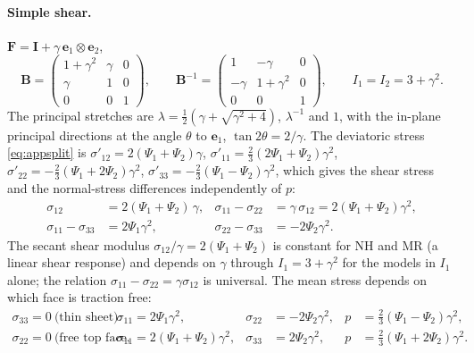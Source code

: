 \documentclass[11pt]{article}
\newcommand{\be}{\bm{e}}
\newcommand{\bF}{\bm{F}}
\newcommand{\bB}{\bm{B}}
\newcommand{\bI}{\bm{I}}
\newcommand{\Pone}{\Psi_{1}}
\newcommand{\Ptwo}{\Psi_{2}}
\newcommand{\Ione}{I_1}
\newcommand{\Itwo}{I_2}
\begin{document}
\paragraph{Simple shear.}
$\bF = \bI + \gamma\,\be_1\otimes\be_2$,
\begin{equation}
  \bB = \begin{pmatrix} 1+\gamma^2 & \gamma & 0 \\ \gamma & 1 & 0 \\ 0 & 0 & 1\end{pmatrix}, \qquad
  \bB^{-1} = \begin{pmatrix} 1 & -\gamma & 0 \\ -\gamma & 1+\gamma^2 & 0 \\ 0 & 0 & 1\end{pmatrix}, \qquad
  \Ione = \Itwo = 3 + \gamma^2 .
\end{equation}
The principal stretches are
$\lambda = \tfrac12(\gamma + \sqrt{\gamma^2 + 4})$, $\lambda^{-1}$ and $1$,
with the in-plane principal directions at the angle $\theta$ to $\be_1$,
$\tan2\theta = 2/\gamma$.  The deviatoric stress \eqref{eq:appsplit} is
$\sigma'_{12} = 2(\Pone + \Ptwo)\gamma$,
$\sigma'_{11} = \tfrac23(2\Pone + \Ptwo)\gamma^2$,
$\sigma'_{22} = -\tfrac23(\Pone + 2\Ptwo)\gamma^2$,
$\sigma'_{33} = -\tfrac23(\Pone - \Ptwo)\gamma^2$, which gives the shear
stress and the normal-stress differences independently of $p$:
\begin{equation}
  \boxed{\;
  \begin{aligned}
  \sigma_{12} &= 2(\Pone + \Ptwo)\,\gamma, &
  \sigma_{11} - \sigma_{22} &= \gamma\,\sigma_{12} = 2(\Pone + \Ptwo)\gamma^2, \\
  \sigma_{11} - \sigma_{33} &= 2\Pone\gamma^2, &
  \sigma_{22} - \sigma_{33} &= -2\Ptwo\gamma^2 .
  \end{aligned}\;}
  \label{eq:appsimpleshear}
\end{equation}
The secant shear modulus $\sigma_{12}/\gamma = 2(\Pone + \Ptwo)$ is constant
for NH and MR (a linear shear response) and depends on $\gamma$ through
$\Ione = 3 + \gamma^2$ for the models in $\Ione$ alone; the relation
$\sigma_{11} - \sigma_{22} = \gamma\sigma_{12}$ is universal.  The mean stress
depends on which face is traction free:
\begin{align}
  \sigma_{33} = 0\ \text{(thin sheet):}\quad &
  \sigma_{11} = 2\Pone\gamma^2, & \sigma_{22} &= -2\Ptwo\gamma^2, &
  p &= \tfrac23(\Pone - \Ptwo)\gamma^2, \\
  \sigma_{22} = 0\ \text{(free top face, plane strain):}\quad &
  \sigma_{11} = 2(\Pone + \Ptwo)\gamma^2, & \sigma_{33} &= 2\Ptwo\gamma^2, &
  p &= \tfrac23(\Pone + 2\Ptwo)\gamma^2 .
\end{align}
\end{document}
